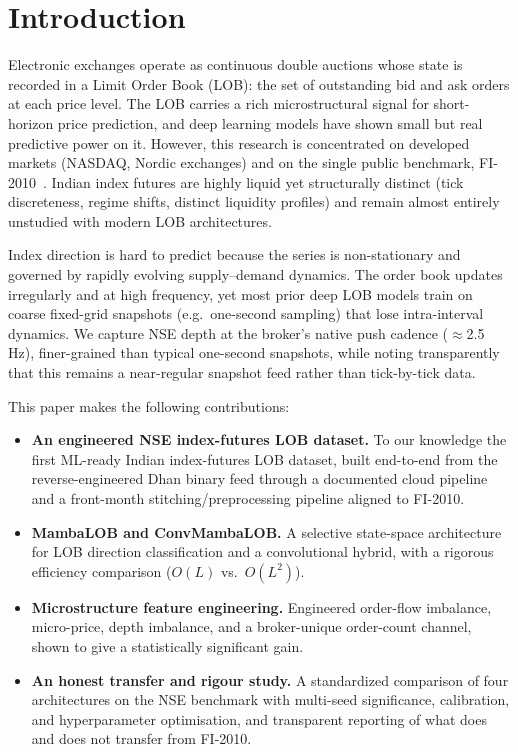 \documentclass[fonts]{icst}
\begin{document}
\maketitle

\section{Introduction}
Electronic exchanges operate as continuous double auctions whose state is recorded in a Limit Order Book
(LOB): the set of outstanding bid and ask orders at each price level. The LOB carries a rich microstructural
signal for short-horizon price prediction, and deep learning models have shown small but real predictive
power on it. However, this research is concentrated on developed markets (NASDAQ, Nordic exchanges) and on
the single public benchmark, FI-2010~\cite{fi2010}. Indian index futures are highly liquid yet structurally
distinct (tick discreteness, regime shifts, distinct liquidity profiles) and remain almost entirely unstudied
with modern LOB architectures.

Index direction is hard to predict because the series is non-stationary and governed by rapidly evolving
supply--demand dynamics. The order book updates irregularly and at high frequency, yet most prior deep LOB
models train on coarse fixed-grid snapshots (e.g.\ one-second sampling) that lose intra-interval dynamics. We
capture NSE depth at the broker's native push cadence ($\approx$2.5\,Hz), finer-grained than typical
one-second snapshots, while noting transparently that this remains a near-regular snapshot feed rather than
tick-by-tick data.

This paper makes the following contributions:
\begin{itemize}
\item \textbf{An engineered NSE index-futures LOB dataset.} To our knowledge the first ML-ready Indian
index-futures LOB dataset, built end-to-end from the reverse-engineered Dhan binary feed through a documented
cloud pipeline and a front-month stitching/preprocessing pipeline aligned to FI-2010.
\item \textbf{MambaLOB and ConvMambaLOB.} A selective state-space architecture for LOB direction
classification and a convolutional hybrid, with a rigorous efficiency comparison ($O(L)$ vs.\ $O(L^2)$).
\item \textbf{Microstructure feature engineering.} Engineered order-flow imbalance, micro-price, depth
imbalance, and a broker-unique order-count channel, shown to give a statistically significant gain.
\item \textbf{An honest transfer and rigour study.} A standardized comparison of four architectures on the
NSE benchmark with multi-seed significance, calibration, and hyperparameter optimisation, and transparent
reporting of what does and does not transfer from FI-2010.
\end{itemize}
\end{document}
